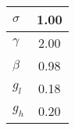\begin{tiny}\begin{tabular}{|l|c|}
\hline
\textbf{$\sigma$}&1.00\\\hline
\textbf{$\gamma$}&2.00\\\hline
\textbf{$\beta$}&0.98\\\hline
\textbf{$g_{l}$}&0.18\\\hline
\textbf{$g_{h}$}&0.20\\\hline
\end{tabular}
\end{tiny}